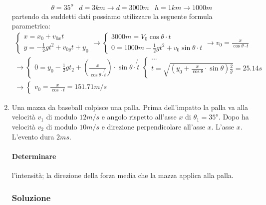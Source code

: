 \documentclass{report}
\begin{document}
\begin{enumerate}
\begin{equation*}
  \begin{matrix}
    \theta=35^o & d=3km \to d=3000m & h=1km \to 1000m
  \end{matrix}
\end{equation*}
partendo da suddetti dati possiamo utilizzare la seguente formula parametrica:
\begin{eqnarray*}
  \begin{cases}
    x=x_0+v_{0x}t\\
    y=-\frac{1}{2}gt^2+v_{0y}t+y_0
  \end{cases}\to
  \begin{cases}
    3000m = V_0\cos \theta \cdot t\\
    0=1000m - \frac{1}{2} gt^2+v_0\sin\theta\cdot t
  \end{cases}\to
  v_0=\frac{x}{\cos\theta \cdot t}\\
  \to
  \begin{cases}
    0=y_0-\frac{1}{2}gt_2+\left(\frac{x}{\cos \theta\cdot \not{t}}\right)\cdot \sin \theta \cdot \not{t}
  \end{cases}
  \begin{cases}
    ...\\
    t=\sqrt{\left(y_0+\frac{x}{\cos\theta}\cdot \sin\theta\right)\frac{2}{g}}=25.14s
  \end{cases} \\
  \to \begin{cases}
    v_0=\frac{x}{\cos\cdot t} = 151.71m/s
  \end{cases}
\end{eqnarray*}
\item Una mazza da baseball colpisce una palla. Prima dell'impatto la palla va alla velocità $v_1$ di modulo $12m/s$ e angolo rispetto all'asse $x$ di $\theta_1=35^o$. Dopo ha velocità $v_2$ di modulo $10m/s$ e direzione perpendicolare all'asse $x$. L'asse $x$. L'evento dura $2ms$. 
\paragraph{Determinare}

\begin{tasks}
  \task l'intensità;
  \task la direzione della forza media che la mazza applica alla palla.
\end{tasks}

\subsubsection{Soluzione}
\label{sec:sol6}


\end{enumerate}
\end{document}
